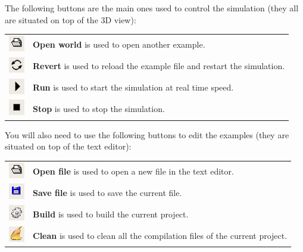 \documentclass[a4paper, 12pt]{article}  		%
\begin{document}
The following buttons are the main ones used to control the simulation (they all are situated on top of the 3D view):
\begin{table}[H]
\begin{center}
\begin{tabular}{ c l }
\includegraphics{button_open.png} & \textbf{Open world} is used to open another example. \\
\includegraphics{button_revert.png} & \textbf{Revert} is used to reload the example file and restart the simulation. \\
\includegraphics{button_play.png} & \textbf{Run} is used to start the simulation at real time speed. \\
\includegraphics{button_stop.png} & \textbf{Stop} is used to stop the simulation. \\
\end{tabular}
\end{center}
\end{table}

You will also need to use the following buttons to edit the examples (they are situated on top of the text editor):
\begin{table}[H]
\begin{center}
\begin{tabular}{ c l }
\includegraphics{button_open.png} & \textbf{Open file} is used to open a new file in the text editor. \\
\includegraphics{button_save.png} & \textbf{Save file} is used to save the current file. \\
\includegraphics{button_compile.png} & \textbf{Build} is used to build the current project. \\
\includegraphics{button_clean.png} & \textbf{Clean} is used to clean all the compilation files of the current project. \\
\end{tabular}
\end{center}
\end{table}
\end{document}
